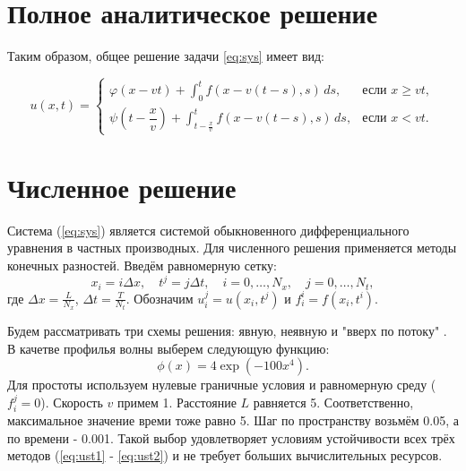 \section*{Полное аналитическое решение}

Таким образом, общее решение задачи \eqref{eq:sys} имеет вид:

\[
u(x,t) =
\begin{cases}
	\varphi(x - vt) + \displaystyle\int_0^t f(x - v(t - s), s)\, ds, & \text{если } x \ge vt, \\
	\psi\left(t - \dfrac{x}{v} \right) + \displaystyle\int_{t - \frac{x}{v}}^t f(x - v(t - s), s) \, ds, & \text{если } x < vt.
\end{cases}
\]

\section{Численное решение}
Система (\ref{eq:sys}) является системой обыкновенного дифференциального уравнения в частных производных.
Для численного решения применяется методы конечных разностей\cite{Turchak2003}. Введём равномерную сетку:
\[
x_i = i \Delta x, \quad t^j = j \Delta t, \quad i = 0, \dots, N_x, \quad j = 0, \dots, N_t,
\]
где $\Delta x = \frac{L}{N_x}$, $\Delta t = \frac{T}{N_t}$. Обозначим $u_i^j = u(x_i, t^j)$ и $f_{i}^i = f (x_{i}, t^i)$.

Будем рассматривать три схемы решения: явную\cite{Turchak2003}, неявную\cite{Turchak2003} и "вверх по потоку" \cite{Patankar1984}.
В качетве профилья волны выберем следующую функцию:
\[
	\phi(x) = 4\exp(-100 x^4).
\]
Для простоты используем нулевые граничные условия и равномерную среду ($f_{i}^j = 0$). 
Скорость $v$ примем 1. Расстояние $L$ равняется 5. Соответственно, максимальное значение времи тоже равно 5.
Шаг по пространству возьмём 0.05, а по времени - 0.001. Такой выбор удовлетворяет условиям устойчивости всех трёх методов (\ref{eq:ust1} - \ref{eq:ust2}) и не требует больших вычислительных ресурсов.





